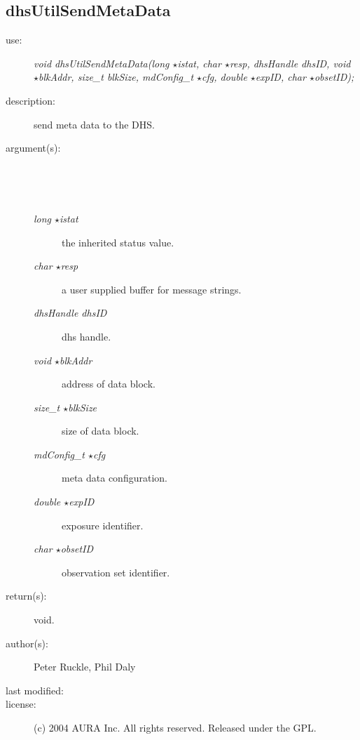 \subsection {dhsUtilSendMetaData} \begin{description} \item[\sc use:] \emph{void dhsUtilSendMetaData(long $\star$istat, char $\star$resp, dhsHandle dhsID, void $\star$blkAddr, size\_t blkSize, mdConfig\_t $\star$cfg, double $\star$expID, char $\star$obsetID);} \item[\sc description:] send meta data to the DHS. \item[\sc argument(s):] \begin{description} \item[\ ] \ \item[\emph{long $\star$istat}] the inherited status value. \item[\emph{char $\star$resp}] a user supplied buffer for message strings. \item[\emph{dhsHandle dhsID}] dhs handle. \item[\emph{void $\star$blkAddr}] address of data block. \item[\emph{size\_t $\star$blkSize}] size of data block. \item[\emph{mdConfig\_t $\star$cfg}] meta data configuration. \item[\emph{double $\star$expID}] exposure identifier. \item[\emph{char $\star$obsetID}] observation set identifier. \end{description} \item[\sc return(s):] void. \item[\sc author(s):] Peter Ruckle, Phil Daly \item[\sc last modified:] \item[\sc license:] (c) 2004 AURA Inc. All rights reserved. Released under the GPL. \end{description}
